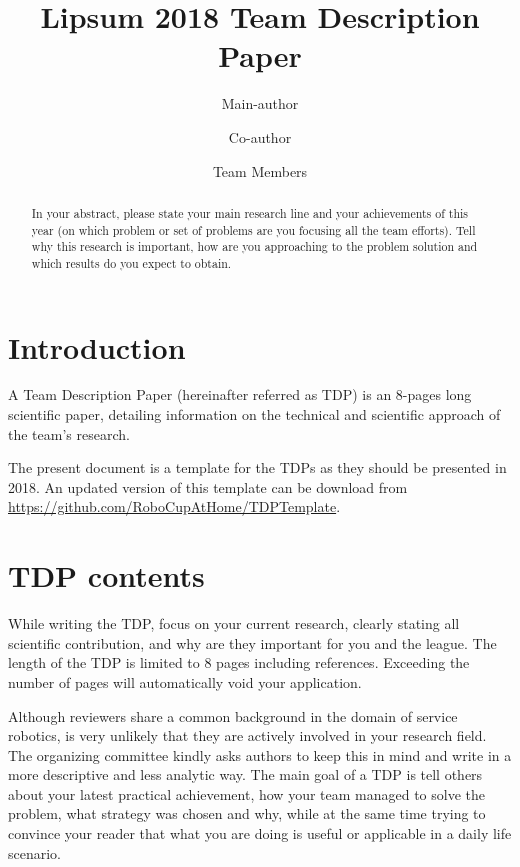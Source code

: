 \documentclass[runningheads,a4paper]{llncs}
\title{Lipsum 2018 Team Description Paper}
\author{Main-author \and Co-author \and Team Members}
\institute{Affiliation name and address, \\
\texttt{http://devoted-web-site.url}}
\begin{document}
\maketitle

%
%

\begin{abstract}

In your abstract, please state your main research line and your achievements of this year (on which problem or set of problems are you focusing all the team efforts). Tell why this research is important, how are you approaching to the problem solution and which results do you expect to obtain.

\end{abstract}



\section{Introduction}
A Team Description Paper (hereinafter referred as TDP) is an 8-pages long scientific paper, detailing information on the technical and scientific approach of the team's research.

The present document is a template for the TDPs as they should be presented in 2018. An updated version of this template can be download from \\\url{https://github.com/RoboCupAtHome/TDPTemplate}.


\section{TDP contents}
While writing the TDP, focus on your current research, clearly stating all scientific contribution, and why are they important for you and the league. The length of the TDP is limited to 8 pages including references. Exceeding the number of pages will automatically void your application.

Although reviewers share a common background in the domain of service robotics, is very unlikely that they are actively involved in your research field. The organizing committee kindly asks authors to keep this in mind and write in a more descriptive and less analytic way. The main goal of a TDP is tell others about your latest practical achievement, how your team managed to solve the problem, what strategy was chosen and why, while at the same time trying to convince your reader that what you are doing is useful or applicable in a daily life scenario.
\end{document}
